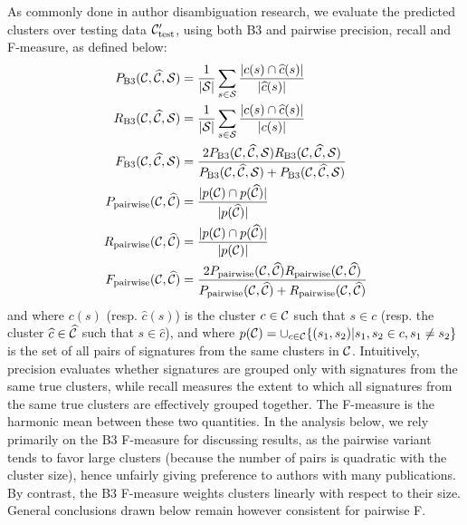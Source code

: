 \documentclass{article}
\begin{document}
As commonly done in author disambiguation research,
we evaluate the predicted clusters over testing data  ${\cal C}_\text{test}^\prime$,
using both B3 and pairwise precision, recall
and F-measure, as defined below:
\begin{align}
P_\text{B3}({\cal C}, \widehat{\cal C}, {\cal S}) &= \frac{1}{|{\cal S}|} \sum_{s \in {\cal S}} \frac{|c(s) \cap \widehat{c}(s)|}{|\widehat{c}(s)|} \\
R_\text{B3}({\cal C}, \widehat{\cal C}, {\cal S}) &= \frac{1}{|{\cal S}|} \sum_{s \in {\cal S}} \frac{|c(s) \cap \widehat{c}(s)|}{|c(s)|}\\
F_\text{B3}({\cal C}, \widehat{\cal C}, {\cal S}) &= \frac{2 P_\text{B3}({\cal C}, \widehat{\cal C}, {\cal S}) R_\text{B3}({\cal C}, \widehat{\cal C}, {\cal S})}{P_\text{B3}({\cal C}, \widehat{\cal C}, {\cal S}) + P_\text{B3}({\cal C}, \widehat{\cal C}, {\cal S})}\\
P_\text{pairwise}({\cal C}, \widehat{\cal C}) &= \frac{|p({\cal C}) \cap p(\widehat{\cal C})|}{|p(\widehat{\cal C})|}\\
R_\text{pairwise}({\cal C}, \widehat{\cal C}) &= \frac{|p({\cal C}) \cap p(\widehat{\cal C})|}{|p({\cal C})|}\\
F_\text{pairwise}({\cal C}, \widehat{\cal C}) &= \frac{2 P_\text{pairwise}({\cal C}, \widehat{\cal C}) R_\text{pairwise}({\cal C}, \widehat{\cal C})}{P_\text{pairwise}({\cal C}, \widehat{\cal C}) + R_\text{pairwise}({\cal C}, \widehat{\cal C})}
\end{align}
and where $c(s)$ (resp. $\widehat{c}(s)$) is the cluster $c \in {\cal C}$ such that
$s \in c$ (resp. the cluster $\widehat{c} \in \widehat{\cal C}$ such that $s
\in \widehat{c}$), and where $p({\cal C}) = \cup_{c \in {\cal C}} \{ (s_1, s_2)
| s_1, s_2 \in c, s_1 \neq s_2 \}$ is the set of all pairs of signatures from
the same clusters in ${\cal C}$. Intuitively, precision evaluates whether signatures
are grouped only with signatures from the same true clusters, while recall
measures the extent to which all signatures from the same true clusters are
effectively grouped together. The F-measure is the harmonic mean between these
two quantities. In the analysis below, we rely primarily on the B3 F-measure for discussing
results, as the pairwise variant tends to favor large clusters (because the number of pairs is quadratic with the cluster size),
hence unfairly giving preference to authors with many publications. By contrast,
the B3 F-measure weights clusters linearly with respect to their size. General conclusions
drawn below remain however consistent for pairwise F.
\end{document}
